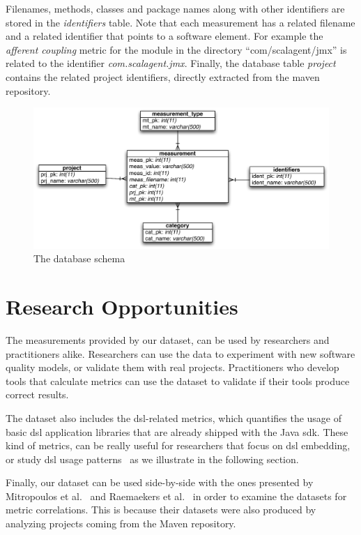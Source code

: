 \documentclass{sig-alternate}
\begin{document}
Filenames, methods, classes and package names along with other identifiers are stored in the \textit{identifiers} table. Note that each measurement has a related filename and a related identifier that points to a software element. For example the \textit{afferent coupling} metric for the module in the directory ``com/scalagent/jmx'' is related to the identifier \textit{com.scalagent.jmx}.
Finally, the database table \textit{project} contains the related project identifiers, directly extracted from the maven repository.

\begin{figure}
\centering
\includegraphics[scale=0.7]{database-schema}
\caption{The database schema}
\label{fig:database-schema}
\end{figure}

\section{Research Opportunities}
\label{sec:research-opportunities}

The measurements provided by our dataset, can be used by researchers and practitioners alike. Researchers can use the data to experiment with new software quality models, or validate them with real projects. Practitioners who develop tools that calculate metrics can use the dataset to validate if their tools produce correct results.

The dataset also includes the {\sc dsl}-related metrics, which quantifies the usage of basic {\sc dsl} application libraries that are already shipped with the Java {\sc sdk}. These kind of metrics, can be really useful for researchers that focus on {\sc dsl} embedding, or study {\sc dsl} usage patterns~\cite{KARA14} as we illustrate in the following section.

Finally, our dataset can be used side-by-side with the ones presented by Mitropoulos et al.~\cite{HP04} and Raemaekers et al.~\cite{RDV13} in order to examine the datasets for metric correlations. This is because their datasets were also produced by analyzing projects coming from the Maven repository.
\end{document}
